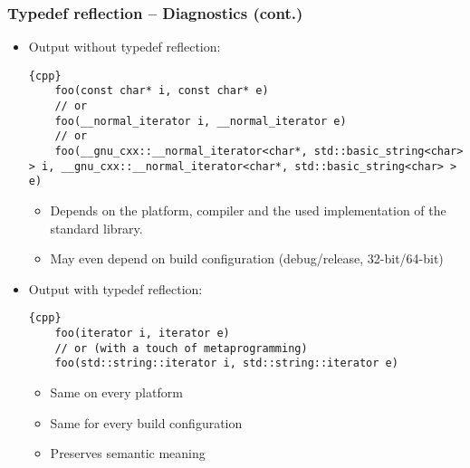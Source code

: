 \documentclass[compress,table,xcolor=table]{beamer}
\begin{document}
\begin{frame}[fragile]
\frametitle{Typedef reflection -- Diagnostics (cont.)}
  \footnotesize
  \begin{itemize}
  \item Output without typedef reflection:
    \begin{lstlisting}{cpp}
	foo(const char* i, const char* e)
	// or
	foo(__normal_iterator i, __normal_iterator e)
	// or
	foo(__gnu_cxx::__normal_iterator<char*, std::basic_string<char> > i, __gnu_cxx::__normal_iterator<char*, std::basic_string<char> > e)
    \end{lstlisting}
    \begin{itemize}
      \scriptsize
      \item Depends on the platform, compiler and the used implementation of
        the standard library.
      \item May even depend on build configuration (debug/release, 32-bit/64-bit)
    \end{itemize}
  \item Output with typedef reflection:
    \begin{lstlisting}{cpp}
	foo(iterator i, iterator e)
	// or (with a touch of metaprogramming)
	foo(std::string::iterator i, std::string::iterator e)
    \end{lstlisting}
    \begin{itemize}
      \scriptsize
      \item Same on every platform
      \item Same for every build configuration
      \item Preserves semantic meaning
    \end{itemize}
  \end{itemize}
\end{frame}
\end{document}
